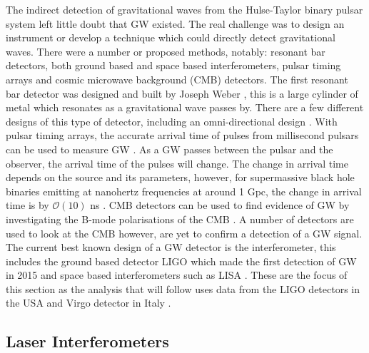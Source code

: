 The indirect detection of gravitational waves from the Hulse-Taylor binary
pulsar system \citep{weisberg1981GravitationalWaves} left little doubt that \gls{GW} existed.  The
real challenge was to design an instrument or develop a technique which could directly detect
gravitational waves. There were a number or proposed methods, notably: resonant bar detectors, both
ground based and space based interferometers, pulsar timing arrays and cosmic microwave background (CMB)
detectors. The first resonant bar detector was designed and built by Joseph
Weber \citep{weber1966ObservationThermal}, this is a large cylinder of metal
which resonates as a gravitational wave passes by.  There are a few different designs
of this type of detector, including an omni-directional design
\citep{dewaard2003MiniGRAILFirst}. 
With pulsar timing arrays, the accurate arrival time of pulses
from millisecond pulsars can be used to measure \gls{GW}
\citep{hobbs2017GravitationalWave}. As a \gls{GW} passes between the pulsar and
the observer, the arrival time of the pulses will change. The change in arrival time depends on the source and its parameters, however, for supermassive black hole binaries emitting at nanohertz frequencies at around 1 Gpc, the change in arrival time is by $\mathcal{O}(10)$ ns \citep{hobbs2017GravitationalWave}.  \gls{CMB} detectors can be used to find evidence of \gls{GW} by investigating the B-mode polarisations of the \gls{CMB}
\citep{ade2018ConstraintsPrimordial}. A number of
detectors are used to look at the \gls{CMB} however, are yet to
confirm a detection of a \gls{GW} signal.  
The current best known design of a \gls{GW} detector is the interferometer, this includes the ground based detector \gls{LIGO} \citep{aasi2015AdvancedLIGO}
which made the first detection of \gls{GW} in 2015
\citep{abbott2016ObservationGravitational} and space based interferometers such as \gls{LISA} \citep{danzmann1996LISALaser}.  These are the focus of this
section as the analysis that will follow uses data from the \gls{LIGO}
detectors in the USA \citep{abbott2009LIGOLaser,aasi2015AdvancedLIGO} and Virgo
detector in Italy
\citep{acernese2015AdvancedVirgo,acernese2008StatusVirgo}.

\subsection{\label{intro:detector:ligo}Laser Interferometers}

